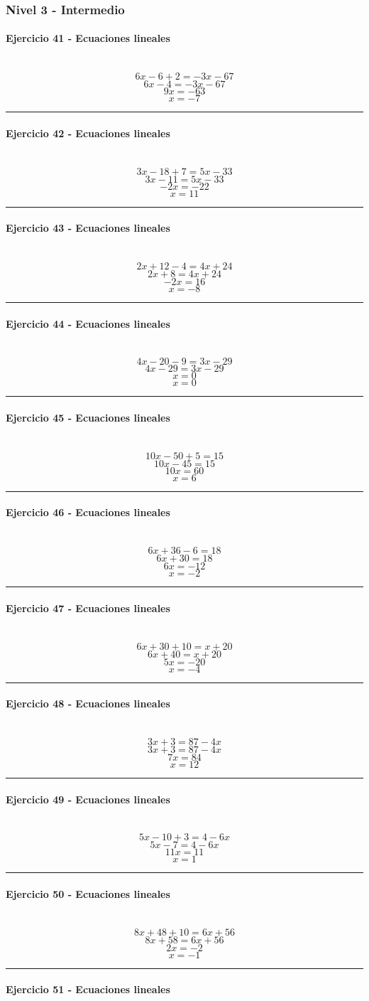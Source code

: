 \documentclass[10pt,a4paper]{article}
\newcommand{\res}[1]{\paragraph{#1}\mbox{}\\[-1.2em]}
\begin{document}
\subsubsection*{Nivel 3 - Intermedio}
\res{Ejercicio 41 - Ecuaciones lineales}
\[ 6 x - 6+2=- 3 x - 67 \]
\[ 6 x - 4=- 3 x - 67 \]
\[ 9 x=-63 \]
\[ \boxed{x=-7} \]
\vspace{1mm}\hrule\vspace{2mm}
\res{Ejercicio 42 - Ecuaciones lineales}
\[ 3 x - 18+7=5 x - 33 \]
\[ 3 x - 11=5 x - 33 \]
\[ - 2 x=-22 \]
\[ \boxed{x=11} \]
\vspace{1mm}\hrule\vspace{2mm}
\res{Ejercicio 43 - Ecuaciones lineales}
\[ 2 x + 12-4=4 x + 24 \]
\[ 2 x + 8=4 x + 24 \]
\[ - 2 x=16 \]
\[ \boxed{x=-8} \]
\vspace{1mm}\hrule\vspace{2mm}
\res{Ejercicio 44 - Ecuaciones lineales}
\[ 4 x - 20-9=3 x - 29 \]
\[ 4 x - 29=3 x - 29 \]
\[ x=0 \]
\[ \boxed{x=0} \]
\vspace{1mm}\hrule\vspace{2mm}
\res{Ejercicio 45 - Ecuaciones lineales}
\[ 10 x - 50+5=15 \]
\[ 10 x - 45=15 \]
\[ 10 x=60 \]
\[ \boxed{x=6} \]
\vspace{1mm}\hrule\vspace{2mm}
\res{Ejercicio 46 - Ecuaciones lineales}
\[ 6 x + 36-6=18 \]
\[ 6 x + 30=18 \]
\[ 6 x=-12 \]
\[ \boxed{x=-2} \]
\vspace{1mm}\hrule\vspace{2mm}
\res{Ejercicio 47 - Ecuaciones lineales}
\[ 6 x + 30+10=x + 20 \]
\[ 6 x + 40=x + 20 \]
\[ 5 x=-20 \]
\[ \boxed{x=-4} \]
\vspace{1mm}\hrule\vspace{2mm}
\res{Ejercicio 48 - Ecuaciones lineales}
\[ 3 x + 3=87 - 4 x \]
\[ 3 x + 3=87 - 4 x \]
\[ 7 x=84 \]
\[ \boxed{x=12} \]
\vspace{1mm}\hrule\vspace{2mm}
\res{Ejercicio 49 - Ecuaciones lineales}
\[ 5 x - 10+3=4 - 6 x \]
\[ 5 x - 7=4 - 6 x \]
\[ 11 x=11 \]
\[ \boxed{x=1} \]
\vspace{1mm}\hrule\vspace{2mm}
\res{Ejercicio 50 - Ecuaciones lineales}
\[ 8 x + 48+10=6 x + 56 \]
\[ 8 x + 58=6 x + 56 \]
\[ 2 x=-2 \]
\[ \boxed{x=-1} \]
\vspace{1mm}\hrule\vspace{2mm}
\res{Ejercicio 51 - Ecuaciones lineales}
\end{document}
